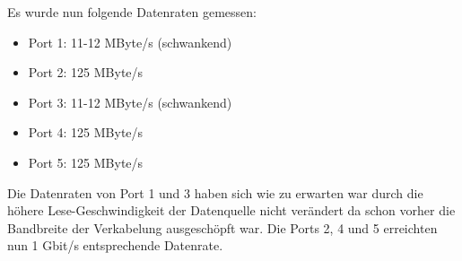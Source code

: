 \documentclass[12pt,a4paper,titlepage]{scrartcl} %
\begin{document}
Es wurde nun folgende Datenraten gemessen:
\begin{itemize}
\item Port 1: 11-12 MByte/s (schwankend)
\item Port 2: 125 MByte/s
\item Port 3: 11-12 MByte/s (schwankend)
\item Port 4: 125 MByte/s
\item Port 5: 125 MByte/s
\end{itemize}
Die Datenraten von Port 1 und 3 haben sich wie zu erwarten war durch die höhere Lese-Geschwindigkeit der Datenquelle nicht verändert da schon vorher die Bandbreite der Verkabelung ausgeschöpft war. Die Ports 2, 4 und 5 erreichten nun 1 Gbit/s entsprechende Datenrate.
\end{document}
